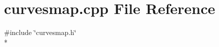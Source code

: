 \section{curvesmap.\+cpp File Reference}
\label{bk3_2extscaleplotscenewidget_2curvesmap_8cpp}
{\ttfamily \#include \char`\"{}curvesmap.\+h\char`\"{}}\\*
